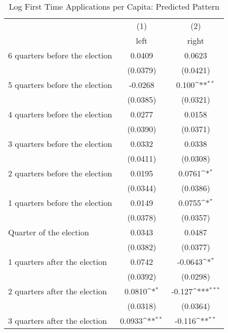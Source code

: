 \begin{table}[htbp]\centering
\def\sym#1{\ifmmode^{#1}\else\(^{#1}\)\fi}
\caption{Log First Time Applications per Capita: Predicted Pattern}
\begin{tabular}{l*{2}{c}}
\hline\hline
                    &\multicolumn{1}{c}{(1)}&\multicolumn{1}{c}{(2)}\\
                    &\multicolumn{1}{c}{left}&\multicolumn{1}{c}{right}\\
\hline
 6 quarters before the election&      0.0409         &      0.0623         \\
                    &    (0.0379)         &    (0.0421)         \\
[1em]
 5 quarters before the election&     -0.0268         &       0.100\sym{**} \\
                    &    (0.0385)         &    (0.0321)         \\
[1em]
 4 quarters before the election&      0.0277         &      0.0158         \\
                    &    (0.0390)         &    (0.0371)         \\
[1em]
 3 quarters before the election&      0.0332         &      0.0338         \\
                    &    (0.0411)         &    (0.0308)         \\
[1em]
 2 quarters before the election&      0.0195         &      0.0761\sym{*}  \\
                    &    (0.0344)         &    (0.0386)         \\
[1em]
 1 quarters before the election&      0.0149         &      0.0755\sym{*}  \\
                    &    (0.0378)         &    (0.0357)         \\
[1em]
Quarter of the election&      0.0343         &      0.0487         \\
                    &    (0.0382)         &    (0.0377)         \\
[1em]
 1 quarters after the election&      0.0742         &     -0.0643\sym{*}  \\
                    &    (0.0392)         &    (0.0298)         \\
[1em]
 2 quarters after the election&      0.0810\sym{*}  &      -0.127\sym{***}\\
                    &    (0.0318)         &    (0.0364)         \\
[1em]
 3 quarters after the election&      0.0933\sym{**} &      -0.116\sym{**} \\

\end{tabular}
\end{table}
